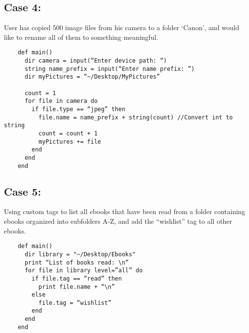 \documentclass[11pt]{article}
\begin{document}
\subsection{Case 4:}
User has copied 500 image files from his camera to a folder ‘Canon’, and would like to rename all of them to something meaningful.
\begin{listing}[H]
  \begin{verbatim}
    def main()
      dir camera = input(“Enter device path: “)
      string name_prefix = input(“Enter name prefix: ”)
      dir myPictures = “~/Desktop/MyPictures”

      count = 1
      for file in camera do
        if file.type == “jpeg” then
          file.name = name_prefix + string(count) //Convert int to string
          count = count + 1
          myPictures += file
        end
      end
    end
  \end{verbatim}
\end{listing}

\subsection{Case 5:}
Using custom tags to list all ebooks that have been read from a folder containing ebooks organized into subfolders A-Z, and add the “wishlist” tag to all other ebooks.
\begin{listing}[H]
  \begin{verbatim}
    def main()
      dir library = "~/Desktop/Ebooks"
      print “List of books read: \n”
      for file in library level=”all” do
        if file.tag == “read” then
          print file.name + “\n”
        else
          file.tag = “wishlist”
        end
      end
    end
  \end{verbatim}
\end{listing}
\end{document}
